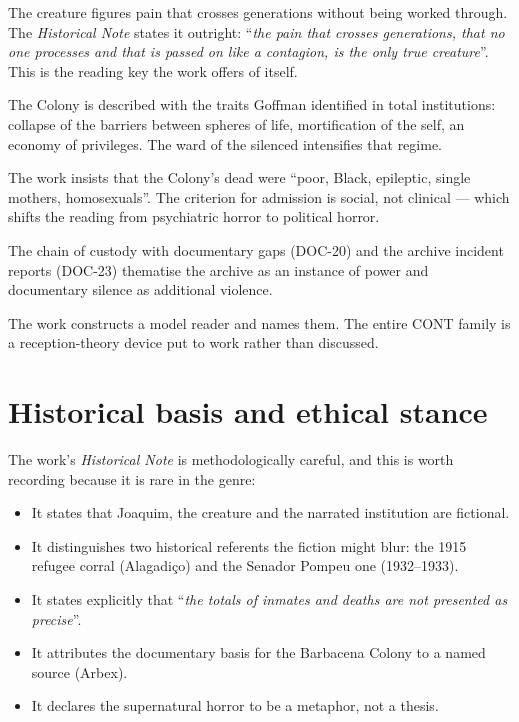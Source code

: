 \documentclass[11pt,a4paper]{article}
\begin{document}
\begin{description}[style=unboxed,leftmargin=0pt]
\item[Trauma and intergenerational transmission.] The creature figures pain
that crosses generations without being worked through. The
\textit{Historical Note} states it outright: ``\textit{the pain that crosses
generations, that no one processes and that is passed on like a contagion, is
the only true creature}''. This is the reading key the work offers of itself.

\item[Total institutions.] The Colony is described with the traits Goffman
identified in total institutions: collapse of the barriers between spheres of
life, mortification of the self, an economy of privileges. The ward of the
silenced intensifies that regime.

\item[Necropolitics and disposable lives.] The work insists that the Colony's
dead were ``poor, Black, epileptic, single mothers, homosexuals''. The
criterion for admission is social, not clinical --- which shifts the reading
from psychiatric horror to political horror.

\item[Archive, power and gap.] The chain of custody with documentary gaps
(DOC-20) and the archive incident reports (DOC-23) thematise the archive as an
instance of power and documentary silence as additional violence.

\item[Reception and the implicated reader.] The work constructs a model reader
and names them. The entire CONT family is a reception-theory device put to
work rather than discussed.
\end{description}

\section{Historical basis and ethical stance}
\label{sec:ethics}

The work's \textit{Historical Note} is methodologically careful, and this is
worth recording because it is rare in the genre:

\begin{itemize}
\item It states that Joaquim, the creature and the narrated institution are
fictional.
\item It distinguishes two historical referents the fiction might blur: the
1915 refugee corral (Alagadiço) and the Senador Pompeu one (1932--1933).
\item It states explicitly that ``\textit{the totals of inmates and deaths are
not presented as precise}''.
\item It attributes the documentary basis for the Barbacena Colony to a named
source (Arbex).
\item It declares the supernatural horror to be a metaphor, not a thesis.
\end{itemize}
\end{document}
